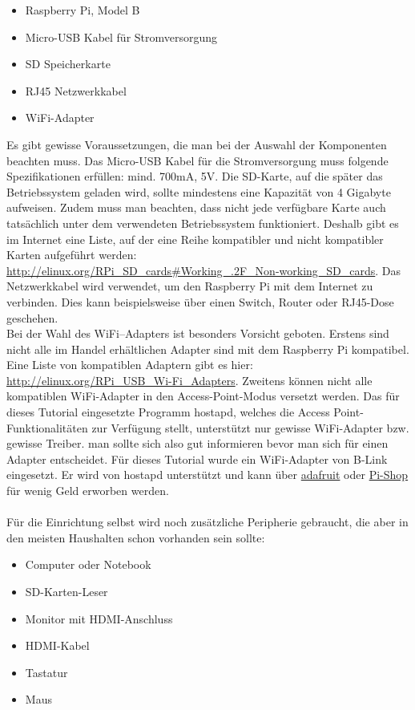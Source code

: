 \begin{itemize}
  \item Raspberry Pi, Model B
  \item Micro-USB Kabel für Stromversorgung
  \item SD Speicherkarte
  \item RJ45 Netzwerkkabel
  \item WiFi-Adapter
\end{itemize}

Es gibt gewisse Voraussetzungen, die man bei der Auswahl der Komponenten beachten muss. Das Micro-USB Kabel für die Stromversorgung muss folgende Spezifikationen erfüllen: mind. 700mA, 5V. Die SD-Karte, auf die später das Betriebssystem geladen wird, sollte mindestens eine Kapazität von 4 Gigabyte aufweisen. Zudem muss man beachten, dass nicht jede verfügbare Karte auch tatsächlich unter dem verwendeten Betriebssystem funktioniert. Deshalb gibt es im Internet eine Liste, auf der eine Reihe kompatibler und nicht kompatibler Karten aufgeführt werden: \url{http://elinux.org/RPi\_SD\_cards\#Working\_.2F\_Non-working\_SD\_cards}.
Das Netzwerkkabel wird verwendet, um den Raspberry Pi mit dem Internet zu verbinden. Dies kann beispielsweise über einen Switch, Router oder RJ45-Dose geschehen.
\\
Bei der Wahl des WiFi--Adapters ist besonders Vorsicht geboten. Erstens sind nicht alle im Handel erhältlichen Adapter sind mit dem Raspberry Pi kompatibel. Eine Liste von kompatiblen Adaptern gibt es hier: \url{http://elinux.org/RPi_USB_Wi-Fi_Adapters}.
Zweitens können nicht alle kompatiblen WiFi-Adapter in den Access-Point-Modus versetzt werden. Das für dieses Tutorial eingesetzte Programm hostapd, welches die Access Point-Funktionalitäten zur Verfügung stellt, unterstützt nur gewisse WiFi-Adapter bzw. gewisse Treiber. man sollte sich also gut informieren bevor man sich für einen Adapter entscheidet. 
Für dieses Tutorial wurde ein WiFi-Adapter von B-Link eingesetzt. Er wird von hostapd unterstützt und kann über \href{http://www.adafruit.com/products/1030}{adafruit} oder \href{http://www.pi-shop.ch/usb-wifi-802-11b-g-n-module-mit-antenne-fuer-raspberry-pi}{Pi-Shop} für wenig Geld erworben werden.
\\
\\
Für die Einrichtung selbst wird noch zusätzliche Peripherie gebraucht, die aber in den meisten Haushalten schon vorhanden sein sollte:

\begin{itemize}
  \item Computer oder Notebook
  \item SD-Karten-Leser
  \item Monitor mit HDMI-Anschluss
  \item HDMI-Kabel
  \item Tastatur
  \item Maus
\end{itemize}

